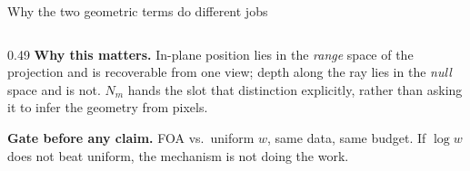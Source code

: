\documentclass[aspectratio=169,10pt]{beamer}
\begin{document}
\begin{frame}{Why the two geometric terms do different jobs}
\begin{columns}[T,onlytextwidth]
\begin{column}{0.49\textwidth}
\medskip
\textbf{Why this matters.} In-plane position lies in the
\emph{range} space of the projection and is recoverable from one view;
depth along the ray lies in the \emph{null} space and is not. $N_m$
hands the slot that distinction explicitly, rather than asking it to
infer the geometry from pixels.

\medskip
\textbf{Gate before any claim.} FOA vs.\ uniform $w$, same data, same
budget. If $\log w$ does not beat uniform, the mechanism is not doing
the work.
\end{column}
\end{columns}
\end{frame}
\end{document}
